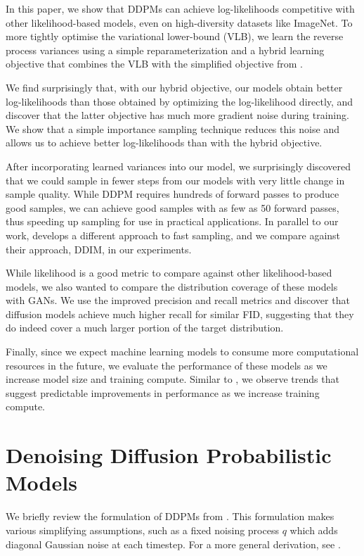 \documentclass{article}
\begin{document}
In this paper, we show that DDPMs can achieve log-likelihoods competitive with other likelihood-based models, even on high-diversity datasets like ImageNet. To more tightly optimise the variational lower-bound (VLB), we learn the reverse process variances using a simple reparameterization and a hybrid learning objective that combines the VLB with the simplified objective from \citet{ddpm}.

We find surprisingly that, with our hybrid objective, our models obtain better log-likelihoods than those obtained by optimizing the log-likelihood directly, and discover that the latter objective has much more gradient noise during training. We show that a simple importance sampling technique reduces this noise and allows us to achieve better log-likelihoods than with the hybrid objective.

After incorporating learned variances into our model, we surprisingly discovered that we could sample in fewer steps from our models with very little change in sample quality. While DDPM \citep{ddpm} requires hundreds of forward passes to produce good samples, we can achieve good samples with as few as 50 forward passes, thus speeding up sampling for use in practical applications. In parallel to our work, \citet{ddim} develops a different approach to fast sampling, and we compare against their approach, DDIM, in our experiments.

While likelihood is a good metric to compare against other likelihood-based models, we also wanted to compare the distribution coverage of these models with GANs. We use the improved precision and recall metrics \citep{improvedpr} and discover that diffusion models achieve much higher recall for similar FID, suggesting that they do indeed cover a much larger portion of the target distribution. 

Finally, since we expect machine learning models to consume more computational resources in the future, we evaluate the performance of these models as we increase model size and training compute. Similar to \cite{scalingcompendium}, we observe trends that suggest predictable improvements in performance as we increase training compute. 

\section{Denoising Diffusion Probabilistic Models}
\label{sec:ddpm}
We briefly review the formulation of DDPMs from \citet{ddpm}. This formulation makes various simplifying assumptions, such as a fixed noising process $q$ which adds diagonal Gaussian noise at each timestep. For a more general derivation, see \citet{diffusion}.
\end{document}
